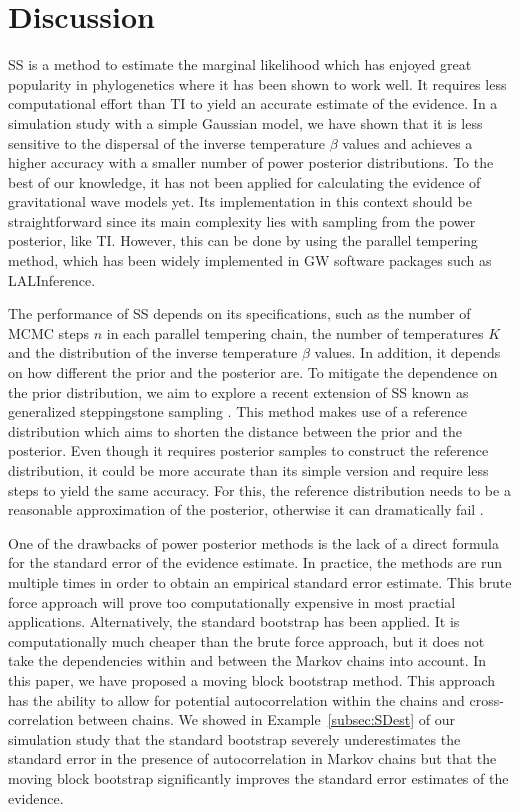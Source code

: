 \documentclass[aps,reprint,amsmath,amssymb,showpacs,showkeys]{revtex4-1}%
\begin{document}
\section{Discussion}
SS is a method to estimate the marginal likelihood which has enjoyed great popularity in phylogenetics where it has been shown to work well.  It requires  less computational effort than TI to yield an accurate estimate of the evidence. In a simulation study with a simple Gaussian model, we have shown that it is less sensitive to the dispersal of the inverse temperature  $\beta$ values and achieves a higher accuracy with a smaller number of power posterior distributions.  To the best of our knowledge, it has not been applied for calculating the evidence of gravitational wave models yet.  Its implementation in this context should be straightforward since its main complexity lies with sampling from the power posterior, like TI.  However, this can be done by using the parallel tempering method, which has been widely implemented in GW software packages such as LALInference. 

The performance of SS depends on its specifications, such as the number of MCMC steps  $n$ in each parallel tempering chain, the number of temperatures $K$ and the distribution of the inverse temperature $\beta$ values.  In addition, it depends on how different the prior and the posterior are.  To mitigate the dependence on the prior distribution, we aim to explore a recent extension of SS  known as generalized steppingstone sampling \citep[GSS;][]{fan:2011}.  This method makes use of a reference distribution which aims to shorten the distance between the prior and the posterior.  Even though it requires posterior samples to construct the reference distribution, it could be more accurate than its simple version and require less steps to yield the same accuracy.  For this, the reference distribution needs to be a reasonable approximation of the posterior, otherwise it can dramatically fail \citep{Maturana:2017b}.  

One of the drawbacks of power posterior methods is the lack of a direct formula for the standard error of the evidence estimate.  In practice, the methods are run multiple times in order to obtain an empirical standard error estimate. This brute force approach  will prove too computationally expensive in most practial applications.  Alternatively,  the standard bootstrap has been applied.
It is computationally much cheaper than the brute force approach, but it does not take  the dependencies within and between the Markov chains  into account.  In this paper, we have proposed a moving block bootstrap method.  This approach has the ability to  allow for potential autocorrelation within the chains and cross-correlation between chains.  We showed in  Example~\ref{subsec:SDest} of our simulation study that the standard bootstrap severely underestimates the standard error in the presence of autocorrelation in  Markov chains but that the moving block bootstrap  significantly improves the standard error estimates of the evidence.  
\end{document}
